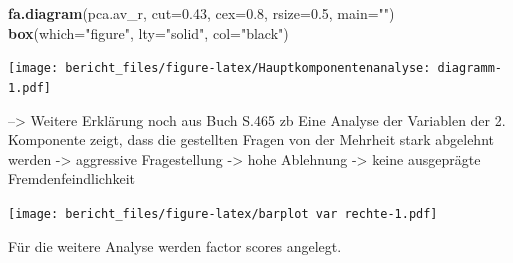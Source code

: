 \documentclass[]{article}
\newenvironment{Shaded}{\begin{snugshade}}{\end{snugshade}}
\newcommand{\KeywordTok}[1]{\textcolor[rgb]{0.13,0.29,0.53}{\textbf{{#1}}}}
\newcommand{\DataTypeTok}[1]{\textcolor[rgb]{0.13,0.29,0.53}{{#1}}}
\newcommand{\DecValTok}[1]{\textcolor[rgb]{0.00,0.00,0.81}{{#1}}}
\newcommand{\FloatTok}[1]{\textcolor[rgb]{0.00,0.00,0.81}{{#1}}}
\newcommand{\CharTok}[1]{\textcolor[rgb]{0.31,0.60,0.02}{{#1}}}
\newcommand{\StringTok}[1]{\textcolor[rgb]{0.31,0.60,0.02}{{#1}}}
\newcommand{\NormalTok}[1]{{#1}}
\begin{document}
\begin{Shaded}
\begin{Highlighting}[]
\KeywordTok{fa.diagram}\NormalTok{(pca.av_r, }\DataTypeTok{cut=}\FloatTok{0.43}\NormalTok{, }\DataTypeTok{cex=}\FloatTok{0.8}\NormalTok{, }\DataTypeTok{rsize=}\FloatTok{0.5}\NormalTok{, }\DataTypeTok{main=}\StringTok{""}\NormalTok{)}
\KeywordTok{box}\NormalTok{(}\DataTypeTok{which=}\StringTok{"figure"}\NormalTok{, }\DataTypeTok{lty=}\StringTok{"solid"}\NormalTok{, }\DataTypeTok{col=}\StringTok{"black"}\NormalTok{)}
\end{Highlighting}
\end{Shaded}

\texttt{[image: bericht\_files/figure-latex/Hauptkomponentenanalyse: diagramm-1.pdf]}

--\textgreater{} Weitere Erklärung noch aus Buch S.465 zb Eine Analyse
der Variablen der 2. Komponente zeigt, dass die gestellten Fragen von
der Mehrheit stark abgelehnt werden -\textgreater{} aggressive
Fragestellung -\textgreater{} hohe Ablehnung -\textgreater{} keine
ausgeprägte Fremdenfeindlichkeit

\begin{Shaded}
\end{Shaded}

\texttt{[image: bericht\_files/figure-latex/barplot var rechte-1.pdf]}

Für die weitere Analyse werden factor scores angelegt.
\end{document}
